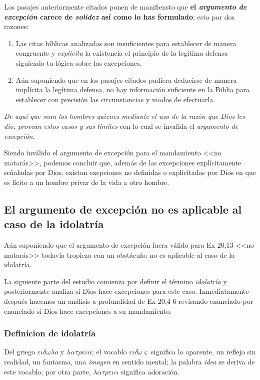 \documentclass{article}
\begin{document}
Los pasajes anteriormente citados ponen de manifiensto que \textbf{el \emph{argumento de excepci\'on} carece de \emph{solidez} as\'{i} como lo has formulado}; esto por dos razones:

\begin{enumerate}
\item Las citas b\'{i}blicas analizadas son insuficientes para establecer de manera congruente y \emph{expl\'{i}cita} la existencia el principio de la leg\'{i}tima defensa siguiendo tu l\'ogica sobre las excepciones.
\item A\'un suponiendo que en los pasajes citados pudiera deducirse de manera impl\'{i}cita la leg\'{i}tima defensa, no hay informaci\'on suficiente en la Biblia para establecer con precisi\'on las circunstancias y modos de efectuarla.
\end{enumerate}

\noindent
\emph{De aqu\'{i} que sean los hombres quienes mediante el uso de la raz\'on que Dios les dio, provean estos casos y sus l\'{i}mites} con lo cual se invalida el \emph{argumento de excepci\'on}.

Siendo inv\'alido el argumento de excepci\'on para el mandamiento <<no matar\'as>>, podemos concluir que, adem\'as de las excepciones expl\'{i}citamente se\~naladas por Dios, existan exepciones no definidas o explicitadas por Dios en que es l\'{i}cito a un hombre privar de la vida a otro hombre.

\subsection{El argumento de excepci\'on no es aplicable al caso de la idolatr\'{i}a}

A\'un suponiendo que el argumento de excepci\'on fuera v\'alido para Ex 20,13 <<no matar\'as>> todav\'ia tropieza con un obst\'aculo: no es aplicable al caso de la idolatr\'{i}a.

La siguiente parte del estudio comienza por definir el t\'ermino \emph{idolatr\'{i}a} y posteriormente analiza si Dios hace excepciones para este caso. Inmediatamente despu\'es hacemos un an\'alisis a profundidad de Ex 20,4-6 revisando enunciado por enunciado si Dios hace excepciones a su mandamiento.

\subsubsection{Definicion de idolatr\'{i}a}

Del griego $\varepsilon\iota\delta\omega\lambda o$ y $\lambda\alpha\tau\rho\varepsilon\iota\alpha$; el vocablo $\varepsilon\iota\delta\omega\varsigma$ significa lo aparente, un reflejo sin realidad, un fantasma, una \emph{imagen} en sentido mental; la palabra \emph{idea} se deriva de este vocablo; por otra parte, $\lambda\alpha\tau\rho\varepsilon\iota\alpha$ significa adoraci\'on.
\end{document}
